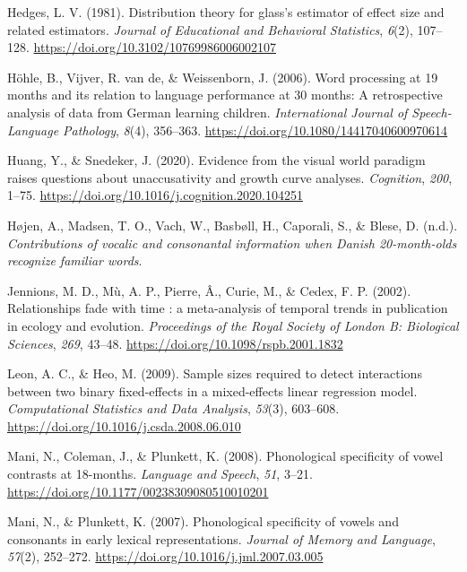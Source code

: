 \documentclass[
  english,
  man, noextraspace]{apa6}
\newlength{\cslhangindent}
\newenvironment{cslreferences}%
  {\setlength{\parindent}{0pt}%
  \everypar{\setlength{\hangindent}{\cslhangindent}}\ignorespaces}%
  {\par}
\begin{document}
\begin{cslreferences}
\leavevmode\hypertarget{ref-Hedges1981}{}%
Hedges, L. V. (1981). Distribution theory for glass's estimator of effect size and related estimators. \emph{Journal of Educational and Behavioral Statistics}, \emph{6}(2), 107--128. \url{https://doi.org/10.3102/10769986006002107}

\leavevmode\hypertarget{ref-Hohle2006}{}%
Höhle, B., Vijver, R. van de, \& Weissenborn, J. (2006). Word processing at 19 months and its relation to language performance at 30 months: A retrospective analysis of data from German learning children. \emph{International Journal of Speech-Language Pathology}, \emph{8}(4), 356--363. \url{https://doi.org/10.1080/14417040600970614}

\leavevmode\hypertarget{ref-Huang2020}{}%
Huang, Y., \& Snedeker, J. (2020). Evidence from the visual world paradigm raises questions about unaccusativity and growth curve analyses. \emph{Cognition}, \emph{200}, 1--75. \url{https://doi.org/10.1016/j.cognition.2020.104251}

\leavevmode\hypertarget{ref-Hojen}{}%
Højen, A., Madsen, T. O., Vach, W., Basbøll, H., Caporali, S., \& Blese, D. (n.d.). \emph{Contributions of vocalic and consonantal information when Danish 20-month-olds recognize familiar words}.

\leavevmode\hypertarget{ref-Jennions2002}{}%
Jennions, M. D., Mù, A. P., Pierre, Â., Curie, M., \& Cedex, F. P. (2002). Relationships fade with time : a meta-analysis of temporal trends in publication in ecology and evolution. \emph{Proceedings of the Royal Society of London B: Biological Sciences}, \emph{269}, 43--48. \url{https://doi.org/10.1098/rspb.2001.1832}

\leavevmode\hypertarget{ref-Leon2009}{}%
Leon, A. C., \& Heo, M. (2009). Sample sizes required to detect interactions between two binary fixed-effects in a mixed-effects linear regression model. \emph{Computational Statistics and Data Analysis}, \emph{53}(3), 603--608. \url{https://doi.org/10.1016/j.csda.2008.06.010}

\leavevmode\hypertarget{ref-Mani2008}{}%
Mani, N., Coleman, J., \& Plunkett, K. (2008). Phonological specificity of vowel contrasts at 18-months. \emph{Language and Speech}, \emph{51}, 3--21. \url{https://doi.org/10.1177/00238309080510010201}

\leavevmode\hypertarget{ref-Mani2007}{}%
Mani, N., \& Plunkett, K. (2007). Phonological specificity of vowels and consonants in early lexical representations. \emph{Journal of Memory and Language}, \emph{57}(2), 252--272. \url{https://doi.org/10.1016/j.jml.2007.03.005}


\end{cslreferences}
\end{document}
